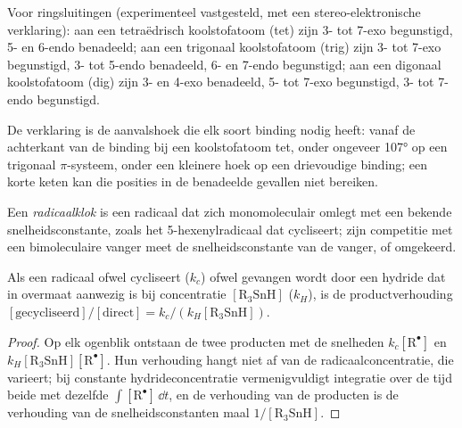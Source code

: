 \begin{proposition}\label{prop:b3:radicals-carbenes:baldwin}
Voor ringsluitingen (experimenteel vastgesteld, met een
stereo-elektronische verklaring): aan een tetraëdrisch koolstofatoom
(tet) zijn 3- tot 7-exo begunstigd, 5- en 6-endo benadeeld; aan een
trigonaal koolstofatoom (trig) zijn 3- tot 7-exo begunstigd, 3- tot 5-endo
benadeeld, 6- en 7-endo begunstigd; aan een digonaal koolstofatoom (dig)
zijn 3- en 4-exo benadeeld, 5- tot 7-exo begunstigd, 3- tot 7-endo
begunstigd.
\end{proposition}

De verklaring is de aanvalshoek die elk soort binding nodig heeft: vanaf
de achterkant van de binding bij een koolstofatoom tet, onder ongeveer
107° op een trigonaal $\pi$-systeem, onder een kleinere hoek op een drievoudige
binding; een korte keten kan die posities in de benadeelde gevallen niet
bereiken.

\begin{definition}[Radicaalklok]\label{def:b3:radicals-carbenes:radical-clock}
Een \emph{radicaalklok} is een radicaal dat zich
monomoleculair omlegt met een bekende snelheidsconstante, zoals het
5-hexenylradicaal dat cycliseert; zijn competitie met een bimoleculaire
vanger meet de snelheidsconstante van de vanger, of omgekeerd.
\end{definition}

\begin{proposition}[Competitiekinetiek]\label{prop:b3:radicals-carbenes:clock}
Als een radicaal ofwel cycliseert ($k_c$) ofwel gevangen wordt door een hydride dat in overmaat aanwezig is bij
concentratie $[\mathrm{R_3SnH}]$ ($k_H$), is de productverhouding
$[\text{gecycliseerd}]/[\text{direct}] = k_c/(k_H[\mathrm{R_3SnH}])$.
\end{proposition}

\begin{proof}
Op elk ogenblik ontstaan de twee producten met de snelheden $k_c[\mathrm R^\bullet]$ en $k_H[\mathrm{R_3SnH}][\mathrm R^\bullet]$. Hun verhouding
hangt niet af van de radicaalconcentratie, die varieert; bij constante
hydrideconcentratie vermenigvuldigt integratie over de tijd beide met
dezelfde
$\int[\mathrm R^\bullet]\,\dd t$, en de verhouding van de producten is de verhouding van de snelheidsconstanten
maal $1/[\mathrm{R_3SnH}]$.
\end{proof}

